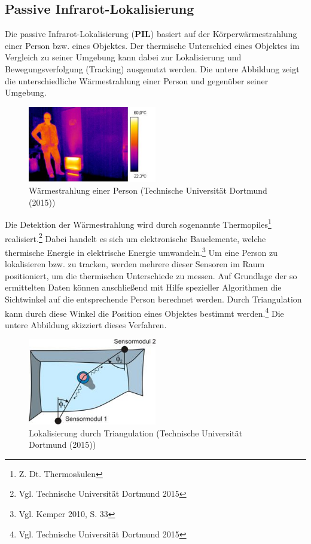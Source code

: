 \subsection{Passive Infrarot-Lokalisierung}
Die passive Infrarot-Lokalisierung (\textbf{PIL}) basiert auf der Körperwärmestrahlung einer Person bzw. eines Objektes. Der thermische Unterschied eines Objektes im Vergleich zu seiner Umgebung kann dabei zur Lokalisierung und Bewegungsverfolgung (Tracking) ausgenutzt werden. Die untere Abbildung zeigt die unterschiedliche Wärmestrahlung einer Person und gegenüber seiner Umgebung.

\begin{figure}[H]
	\centering
	\includegraphics[width=0.5\textwidth]{pictures/pil1}
	\caption{Wärmestrahlung einer Person (Technische Universität Dortmund (2015))}
\end{figure}

Die Detektion der Wärmestrahlung wird durch sogenannte Thermopiles\footnote{Z. Dt. Thermosäulen}  realisiert.\footnote{Vgl. Technische Universität Dortmund 2015} Dabei handelt es sich um elektronische Bauelemente, welche thermische Energie in elektrische Energie umwandeln.\footnote{Vgl. Kemper 2010, S. 33} Um eine Person zu lokalisieren bzw. zu tracken, werden mehrere dieser Sensoren im Raum positioniert, um die thermischen Unterschiede zu messen. Auf Grundlage der so ermittelten Daten können anschließend mit Hilfe spezieller Algorithmen die Sichtwinkel auf die entsprechende Person berechnet werden. Durch Triangulation kann durch diese Winkel die Position eines Objektes bestimmt werden.\footnote{Vgl. Technische Universität Dortmund 2015} Die untere Abbildung skizziert dieses Verfahren.

\begin{figure}[H]
	\centering
	\includegraphics[width=0.5\textwidth]{pictures/triangulation}
	\caption{Lokalisierung durch Triangulation (Technische Universität Dortmund (2015))}
\end{figure}

